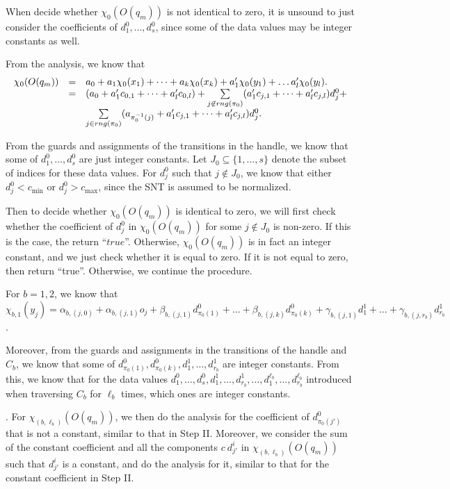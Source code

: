 \documentclass[runningheads,a4paper]{llncs}
\begin{document}
When decide whether $\chi_0(O(q_m))$ is not identical to zero, it is unsound to just consider the coefficients of $d^0_1,\dots,d^0_s$, since some of the data values may be integer constants as well. 

From the analysis, we know that 
\[
\begin{array}{l c l }
\chi_0(O(q_m)) & = & a_0 + a_1 \chi_0(x_1) + \dots + a_k \chi_0(x_k) + a'_1 \chi_0(y_1) + \dots a'_l \chi_0(y_l).\\
& = & (a_0+a'_1 c_{0,1} + \dots + a'_l c_{0,l}) + \sum \limits_{j \not \in rng(\pi_0)}  (a'_1 c_{j,1}+\dots + a'_l c_{j,l}) d^0_j+\\
& & \sum \limits_{j \in rng(\pi_0)} (a_{\pi_0^{-1}(j)}+ a'_1 c_{j,1}+\dots + a'_l c_{j,l}) d^0_j.
\end{array}
\]

From the guards and assignments of the transitions in the handle, we know that some of $d^0_1,\dots,d^0_s$ are just integer constants. Let $J_0 \subseteq \{1,\dots,s\}$ denote the subset of indices for these data values. For $d^0_j$ such that $j \not \in J_0$, we know that either $d^0_j < c_{\min}$ or $d^0_j > c_{\max}$, since the SNT is assumed to be normalized.

Then to decide whether $\chi_0(O(q_m))$ is identical to zero, we will first check whether the coefficient of $d^0_j$ in $\chi_0(O(q_m))$ for some $j \not \in J_0$ is non-zero. If this is the case, the return ``$true$''. Otherwise, $\chi_0(O(q_m))$ is in fact an integer constant, and we just check whether it is equal to zero. If it is not equal to zero, then return ``true''. Otherwise, we continue the procedure.

For $b=1,2$, we know that $\chi_{b,1}(y_j) = \alpha_{b,(j,0)} + \alpha_{b,(j,1)} o_j + \beta_{b,(j,1)} d^0_{\pi_0(1)} + \dots + \beta_{b,(j,k)} d^0_{\pi_0(k)} + \gamma_{b,(j,1)} d^1_1 +\dots + \gamma_{b,(j,r_b)} d^1_{r_b}$.

Moreover, from the guards and assignments in the transitions of the handle and $C_b$, we know that some of $d^0_{\pi_0(1)}, d^0_{\pi_0(k)}, d^1_1,\dots, d^1_{r_b}$ are integer constants. From this, we know that for the data values $d^0_1,\dots, d^0_s, d^1_1,\dots, d^1_{r_b}, \dots, d^{\ell_b}_1,\dots, d^{\ell_b}_{r_b}$ introduced when traversing $C_b$ for $\ell_b$ times, which ones are integer constants.

\smallskip

. For $\chi_{(b,\ell_b)}(O(q_m))$, we then do the analysis for the coefficient of $d^0_{\pi_0(j')}$ that is not a constant, similar to that in Step II.  Moreover, we consider the sum of the constant coefficient and all the components $c\ d^{i}_{j'}$ in  $\chi_{(b,\ell_b)}(O(q_m))$ such that $d^i_{j'}$ is a constant, and do the analysis for it, similar to that for the constant coefficient in Step II.
\end{document}
